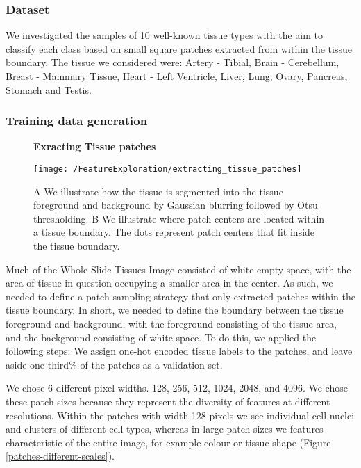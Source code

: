 \documentclass[graybox]{svmult}
\newcommand*{\figuretitle}[1]{%
    {\centering%
    \textbf{#1}%
    \par\medskip}%
}
\begin{document}
\subsubsection{Dataset}
We investigated the samples of 10 well-known tissue types with the aim to classify each class based on small square patches extracted from within the tissue boundary. The tissue we considered were: Artery - Tibial, Brain - Cerebellum, Breast - Mammary Tissue, Heart - Left Ventricle, Liver, Lung, Ovary, Pancreas, Stomach and Testis.

\subsubsection{Training data generation}

\begin{wrapfigure}{l}{0.6\textwidth}
    \figuretitle{Exracting Tissue patches}
    \texttt{[image: /FeatureExploration/extracting\_tissue\_patches]} 
    \caption{\textcolor{ao(english)}{A} We illustrate how the tissue is segmented into the tissue foreground and background by Gaussian blurring followed by Otsu thresholding. \textcolor{ao(english)}{B} We illustrate where patch centers are located within a tissue boundary. The dots represent patch centers that fit inside the tissue boundary. }
    \label{fig:extracting_tissue_patches}
\end{wrapfigure}


Much of the Whole Slide Tissues Image consisted of white empty space, with the area of tissue in question occupying a smaller area in the center. As such, we needed to define a patch sampling strategy that only extracted patches within the tissue boundary. In short, we needed to define the boundary between the tissue foreground and background, with the foreground consisting of the tissue area, and the background consisting of white-space.  To do this, we applied the following steps: We assign one-hot encoded tissue labels to the patches, and leave aside one third\% of the patches as a validation set.

We chose 6 different pixel widths. 128, 256, 512, 1024, 2048, and 4096. We chose these patch sizes because they represent the diversity of features at different resolutions. Within the patches with width 128 pixels we see individual cell nuclei and clusters of different cell types, whereas in large patch sizes we features characteristic of the entire image, for example colour or tissue shape (Figure \ref{patches-different-scales}). 
\end{document}
